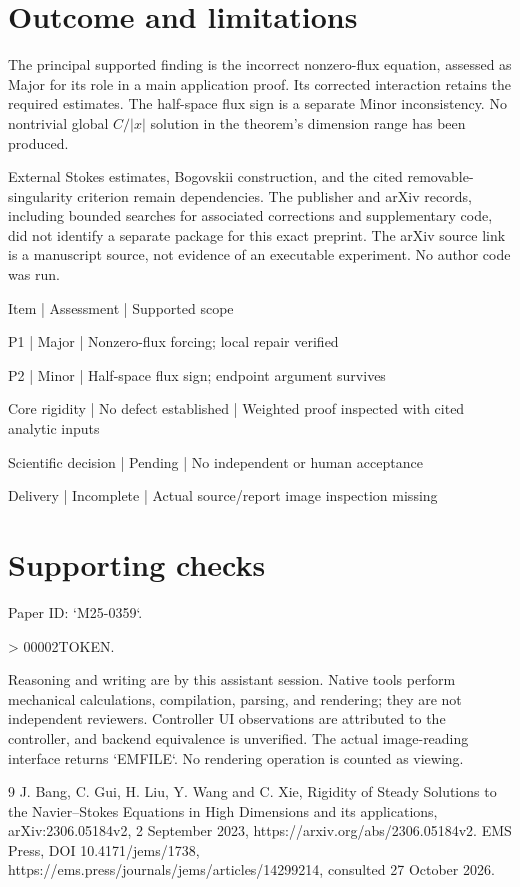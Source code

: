\documentclass[10pt]{article}
\begin{document}
\section*{Outcome and limitations}
The principal supported finding is the incorrect nonzero-flux equation, assessed as Major for its role in a main application proof. Its corrected interaction retains the required estimates. The half-space flux sign is a separate Minor inconsistency. No nontrivial global \(C/|x|\) solution in the theorem’s dimension range has been produced.\par
External Stokes estimates, Bogovskii construction, and the cited removable-singularity criterion remain dependencies. The publisher and arXiv records, including bounded searches for associated corrections and supplementary code, did not identify a separate package for this exact preprint. The arXiv source link is a manuscript source, not evidence of an executable experiment. No author code was run.\par
Item | Assessment | Supported scope\par
P1 | Major | Nonzero-flux forcing; local repair verified\par
P2 | Minor | Half-space flux sign; endpoint argument survives\par
Core rigidity | No defect established | Weighted proof inspected with cited analytic inputs\par
Scientific decision | Pending | No independent or human acceptance\par
Delivery | Incomplete | Actual source/report image inspection missing\par
\section*{Supporting checks}
Paper ID: `M25-0359`.\par
> 00002TOKEN.\par
Reasoning and writing are by this assistant session. Native tools perform mechanical calculations, compilation, parsing, and rendering; they are not independent reviewers. Controller UI observations are attributed to the controller, and backend equivalence is unverified. The actual image-reading interface returns `EMFILE`. No rendering operation is counted as viewing.\par
9 J. Bang, C. Gui, H. Liu, Y. Wang and C. Xie, Rigidity of Steady Solutions to the Navier–Stokes Equations in High Dimensions and its applications, arXiv:2306.05184v2, 2 September 2023, https://arxiv.org/abs/2306.05184v2. EMS Press, DOI 10.4171/jems/1738, https://ems.press/journals/jems/articles/14299214, consulted 27 October 2026.\par
\end{document}
